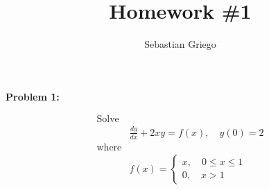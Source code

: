 \documentclass[12pt]{article}
\newenvironment{problem}[1]{
    \textbf{Problem #1:}
}{
    \rmfamily \vspace{1em}
}
\begin{document}
\title{Homework \#1}  %
\author{Sebastian Griego}  %
\maketitle

\begin{problem}{1}
    \[
        \begin{aligned} 
            \text{Solve}\\
            &\frac{dy}{dx}+2xy=f(x),\quad y(0)=2 \\
            \text{where} \\
            &f(x)=\begin{cases}
                x, \quad 0\leq x\leq 1\\
                0, \quad x>1
            \end{cases}
        \end{aligned}
    \]
\end{problem}
\end{document}
